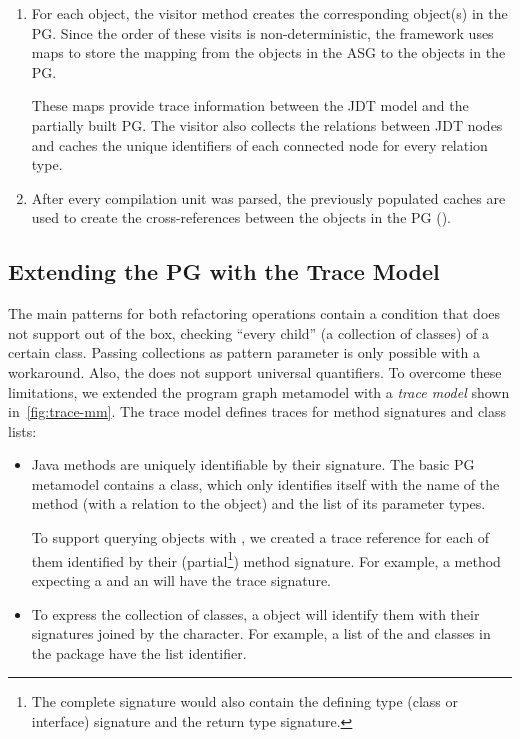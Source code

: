 \documentclass[submission,copyright,creativecommons]{eptcs}
\begin{document}
\begin{enumerate}[noitemsep]
\item For each object, the visitor method creates the corresponding object(s) in the PG. Since the order of these visits is non-deterministic, the framework uses maps to store the mapping from the objects in the ASG to the objects in the PG.

These maps provide trace information between the JDT model and the partially built PG. The visitor also collects the relations between JDT nodes and caches the unique identifiers of each connected node for every relation type. 

\item After every compilation unit was parsed, the previously populated caches are used to create the cross-references between the objects in the PG (\eg {}).
\end{enumerate}

\subsection[Extending the PG with the Trace Model]{Extending the PG with the Trace Model\qquad{}}


\noindent The main patterns for both refactoring operations contain a condition that \eiq does not support out of the box, \eg checking ``every child'' (a collection of classes) of a certain class. Passing collections as pattern parameter is only possible with a workaround. Also, the \iqpl does not support universal quantifiers. To overcome these limitations, we extended the program graph metamodel with a \emph{trace model} shown in~\autoref{fig:trace-mm}. The trace model defines traces for method signatures and class lists:

\begin{itemize}[noitemsep]
\item {} Java methods are uniquely identifiable by their signature. The basic PG metamodel contains a  class, which only identifies itself with the name of the method (with a relation to the  object) and the list of its parameter types.

To support querying  objects with \eiq, we created a trace reference for each of them identified by their (partial\footnote{The complete signature would also contain the defining type (class or interface) signature and the return type signature.}) method signature. For example, a method  expecting a  and an  will have the  trace signature.
\item {} To express the collection of classes, a  object will identify them with their signatures joined by the \ttctt{\#} character. For example, a list of the  and  classes in the  package have the  list identifier.
\end{itemize}
\end{document}

